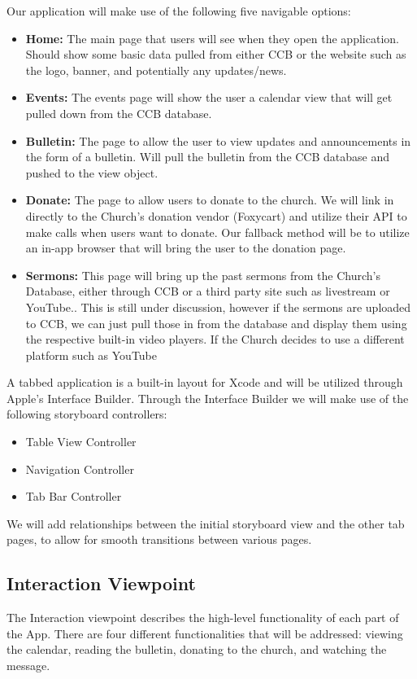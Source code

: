 \documentclass[letterpaper,10pt,draftclsnofoot,onecolumn,titlepage]{IEEEtran}
\begin{document}
			Our application will make use of the following five navigable options:
			\begin{itemize}
				\item \textbf{Home:} The main page that users will see when they open the application. Should show some basic data pulled from either CCB or the website such as the logo, banner, and potentially any updates/news.
				\item \textbf{Events:} The events page will show the user a calendar view that will get pulled down from the CCB database.
				\item \textbf{Bulletin:} The page to allow the user to view updates and announcements in the form of a bulletin. Will pull the bulletin from the CCB database and pushed to the view object.
				\item \textbf{Donate:} The page to allow users to donate to the church. We will link in directly to the Church's donation vendor (Foxycart) and utilize their API to make calls when users want to donate.
					Our fallback method will be to utilize an in-app browser that will bring the user to the donation page.
				\item \textbf{Sermons:} This page will bring up the past sermons from the Church's Database, either through CCB or a third party site such as livestream or YouTube..
					This is still under discussion, however if the sermons are uploaded to CCB, we can just pull those in from the database and display them using the respective built-in video players.
					If the Church decides to use a different platform such as YouTube
			\end{itemize}

			A tabbed application is a built-in layout for Xcode and will be utilized through Apple's Interface Builder.
			Through the Interface Builder we will make use of the following storyboard controllers:
			\begin{itemize}
				\item Table View Controller
				\item Navigation Controller
				\item Tab Bar Controller
			\end{itemize}
			We will add relationships between the initial storyboard view and the other tab pages, to allow for smooth transitions between various pages.

		\subsection{Interaction Viewpoint}
			The Interaction viewpoint describes the high-level functionality of each part of the \gls{App}.
			There are four different functionalities that will be addressed: viewing the calendar, reading the bulletin, donating to the church, and watching the message.
\end{document}
